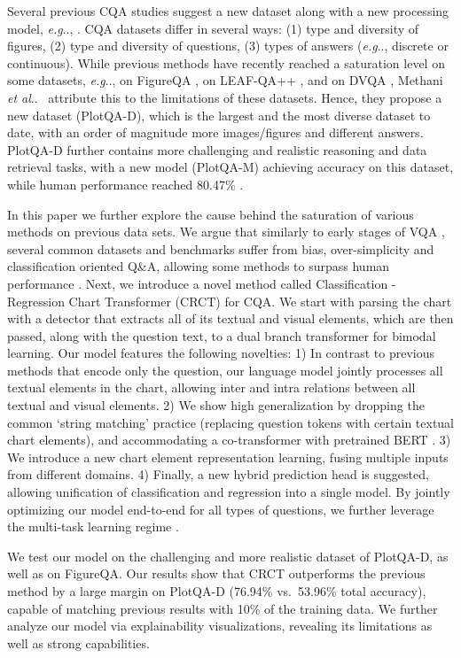 \documentclass[runningheads]{llncs}
\makeatletter
\newcommand\our[1][]{CRCT\xspace}
\newcommand\ourFullname[1][]{Classification - Regression Chart Transformer (\our)\xspace}
\DeclareRobustCommand\onedot{\futurelet\@let@token\@onedot}
\def\@onedot{\ifx\@let@token.\else.\null\fi\xspace}
\def\eg{\emph{e.g}\onedot} \def\Eg{\emph{E.g}\onedot}
\def\etal{\emph{et al}\onedot}
\makeatother
\begin{document}
Several previous CQA studies suggest a new dataset along with a new processing model, \eg, \cite{figureqa,dvqa,plotqa, chaudhry2019leafqa}. 
CQA datasets differ in several ways: (1) type and diversity of figures, (2) type and diversity of questions, (3) types of answers (\eg, discrete or continuous). While previous methods have recently reached a saturation level on some datasets, \eg,  on FigureQA \cite{figureqa},  on LEAF-QA++ \cite{chartqa}, and  on DVQA \cite{dvqa}, Methani \etal~\cite{plotqa} attribute this to the limitations of these datasets. Hence, they propose a new dataset (PlotQA-D), which is the largest and the most diverse dataset to date, with an order of magnitude more images/figures and  different answers. PlotQA-D further contains more challenging and realistic reasoning and data retrieval tasks, with a new model (PlotQA-M) achieving  accuracy on this dataset, while human performance reached 80.47\% \cite{plotqa}.


In this paper we further explore the cause behind the saturation of various methods on previous data sets. We argue that similarly to early stages of VQA \cite{makingVinVQAmatter_CVPR2017}, several common datasets and benchmarks suffer from bias, over-simplicity and classification oriented Q\&A, allowing some methods to surpass human performance \cite{chartqa,prefil}. Next, we introduce a novel method called \ourFullname for CQA. We start with parsing the chart with a detector that extracts all of its textual and visual elements, which are then passed, along with the question text, to a dual branch transformer for bimodal learning. Our model features the following novelties: 1) In contrast to previous methods that encode only the question, our language model jointly processes all textual elements in the chart, allowing inter and intra relations between all textual and visual elements. 2) We show high generalization by dropping the common `string matching' practice (replacing question tokens with certain textual chart elements), and accommodating a co-transformer with pretrained BERT \cite{devlin2019bert}.  3) We introduce a new chart element representation learning, fusing multiple inputs from different domains. 4) Finally, a new hybrid prediction head is suggested, allowing unification of classification and regression into a single model. By jointly optimizing our model end-to-end for all types of questions, we further leverage the multi-task learning regime \cite{zhang2021survey}. 


We test our model on the challenging and more realistic dataset of PlotQA-D, as well as on FigureQA. Our results show that \our outperforms the previous method by a large margin on PlotQA-D (76.94\% vs.~53.96\% total accuracy), capable of matching previous results with 10\% of the training data.
We further analyze our model via explainability visualizations, revealing its limitations as well as strong capabilities.
\end{document}
